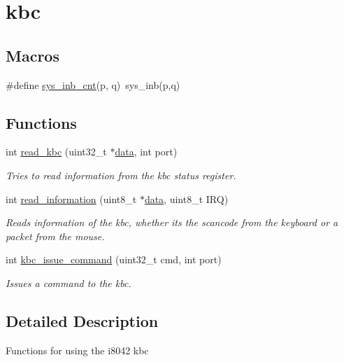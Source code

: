 \hypertarget{group__kbc}{}\section{kbc}
\label{group__kbc}
\subsection*{Macros}
\begin{DoxyCompactItemize}
\item 
\#define \mbox{\hyperlink{group__kbc_gaefb2d8ab6a450744c686e348063ebc32}{sys\+\_\+inb\+\_\+cnt}}(p,  q)~sys\+\_\+inb(p,q)
\end{DoxyCompactItemize}
\subsection*{Functions}
\begin{DoxyCompactItemize}
\item 
int \mbox{\hyperlink{group__kbc_ga77e47edd0806a3ac022baa8431f1f8b8}{read\+\_\+kbc}} (uint32\+\_\+t $\ast$\mbox{\hyperlink{mouse_8c_a325819a8e492ac69542e8b31705af6e9}{data}}, int port)
\begin{DoxyCompactList}\small\item\em Tries to read information from the kbc status register. \end{DoxyCompactList}\item 
int \mbox{\hyperlink{group__kbc_ga51a87bc28290c19518e8bbd5423f508a}{read\+\_\+information}} (uint8\+\_\+t $\ast$\mbox{\hyperlink{mouse_8c_a325819a8e492ac69542e8b31705af6e9}{data}}, uint8\+\_\+t I\+RQ)
\begin{DoxyCompactList}\small\item\em Reads information of the kbc, whether its the scancode from the keyboard or a packet from the mouse. \end{DoxyCompactList}\item 
int \mbox{\hyperlink{group__kbc_ga547e83b3378cd67366e45d3c9565374a}{kbc\+\_\+issue\+\_\+command}} (uint32\+\_\+t cmd, int port)
\begin{DoxyCompactList}\small\item\em Issues a command to the kbc. \end{DoxyCompactList}\end{DoxyCompactItemize}


\subsection{Detailed Description}
Functions for using the i8042 kbc 

